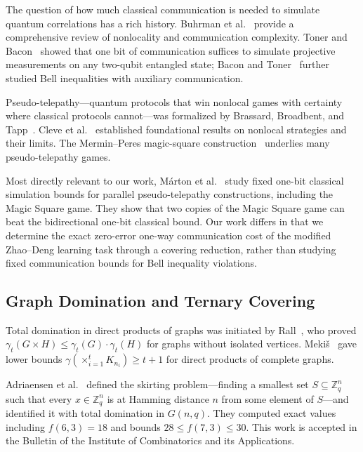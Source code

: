 \documentclass[11pt,letterpaper]{article}
\newcommand{\Z}{\mathbb{Z}}
\newcommand{\gammat}{\gamma_t}
\begin{document}
The question of how much classical communication is needed to simulate quantum correlations has a rich history. Buhrman et al.~\cite{buhrman2010} provide a comprehensive review of nonlocality and communication complexity. Toner and Bacon~\cite{toner2003} showed that one bit of communication suffices to simulate projective measurements on any two-qubit entangled state; Bacon and Toner~\cite{bacon2003} further studied Bell inequalities with auxiliary communication.

Pseudo-telepathy---quantum protocols that win nonlocal games with certainty where classical protocols cannot---was formalized by Brassard, Broadbent, and Tapp~\cite{brassard2005}. Cleve et al.~\cite{cleve2004} established foundational results on nonlocal strategies and their limits. The Mermin--Peres magic-square construction~\cite{mermin1990,peres1990} underlies many pseudo-telepathy games.

Most directly relevant to our work, M\'arton et al.~\cite{marton2024} study fixed one-bit classical simulation bounds for parallel pseudo-telepathy constructions, including the Magic Square game. They show that two copies of the Magic Square game can beat the bidirectional one-bit classical bound. Our work differs in that we determine the exact zero-error one-way communication cost of the modified Zhao--Deng learning task through a covering reduction, rather than studying fixed communication bounds for Bell inequality violations.

\subsection{Graph Domination and Ternary Covering}

Total domination in direct products of graphs was initiated by Rall~\cite{rall2005}, who proved $\gammat(G \times H) \leq \gammat(G) \cdot \gammat(H)$ for graphs without isolated vertices. Meki\v{s}~\cite{mekis2010} gave lower bounds $\gamma(\times_{i=1}^t K_{n_i}) \geq t+1$ for direct products of complete graphs.

Adriaensen et al.~\cite{adriaensen2026} defined the skirting problem---finding a smallest set $S \subseteq \Z_q^n$ such that every $x \in \Z_q^n$ is at Hamming distance $n$ from some element of $S$---and identified it with total domination in $G(n,q)$. They computed exact values including $f(6,3) = 18$ and bounds $28 \leq f(7,3) \leq 30$. This work is accepted in the Bulletin of the Institute of Combinatorics and its Applications.
\end{document}
